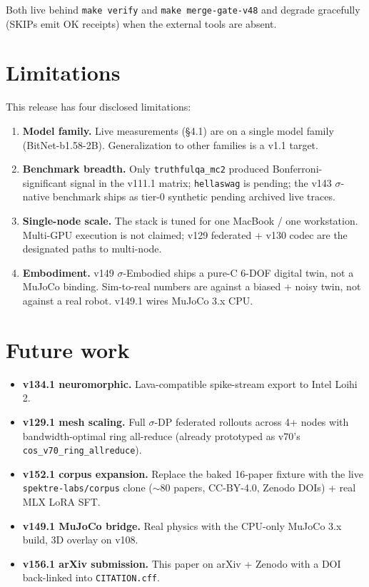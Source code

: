\documentclass[11pt,letterpaper]{article}
\newcommand{\code}[1]{\texttt{#1}}
\begin{document}
Both live behind \code{make verify} and
\code{make merge-gate-v48} and degrade gracefully (SKIPs emit OK
receipts) when the external tools are absent.

\section{Limitations}

This release has four disclosed limitations:

\begin{enumerate}[leftmargin=*,itemsep=2pt]
  \item \textbf{Model family.} Live measurements (\S4.1) are on a
    single model family (BitNet-b1.58-2B). Generalization to
    other families is a v1.1 target.
  \item \textbf{Benchmark breadth.} Only \code{truthfulqa\_mc2}
    produced Bonferroni-significant signal in the v111.1 matrix;
    \code{hellaswag} is pending; the v143 $\sigma$-native
    benchmark ships as tier-0 synthetic pending archived live
    traces.
  \item \textbf{Single-node scale.} The stack is tuned for one
    MacBook / one workstation. Multi-GPU execution is not
    claimed; v129 federated + v130 codec are the designated paths
    to multi-node.
  \item \textbf{Embodiment.} v149 $\sigma$-Embodied ships a
    pure-C 6-DOF digital twin, not a MuJoCo binding. Sim-to-real
    numbers are against a biased + noisy twin, not against a real
    robot. v149.1 wires MuJoCo 3.x CPU.
\end{enumerate}

\section{Future work}

\begin{itemize}[leftmargin=*,itemsep=2pt]
  \item \textbf{v134.1 neuromorphic.} Lava-compatible spike-stream
    export to Intel Loihi 2.
  \item \textbf{v129.1 mesh scaling.} Full $\sigma$-DP federated
    rollouts across 4+ nodes with bandwidth-optimal ring
    all-reduce (already prototyped as v70's
    \code{cos\_v70\_ring\_allreduce}).
  \item \textbf{v152.1 corpus expansion.} Replace the baked
    16-paper fixture with the live \code{spektre-labs/corpus}
    clone ($\sim$80 papers, CC-BY-4.0, Zenodo DOIs) + real MLX
    LoRA SFT.
  \item \textbf{v149.1 MuJoCo bridge.} Real physics with the
    CPU-only MuJoCo 3.x build, 3D overlay on v108.
  \item \textbf{v156.1 arXiv submission.} This paper on arXiv +
    Zenodo with a DOI back-linked into \code{CITATION.cff}.
\end{itemize}
\end{document}

